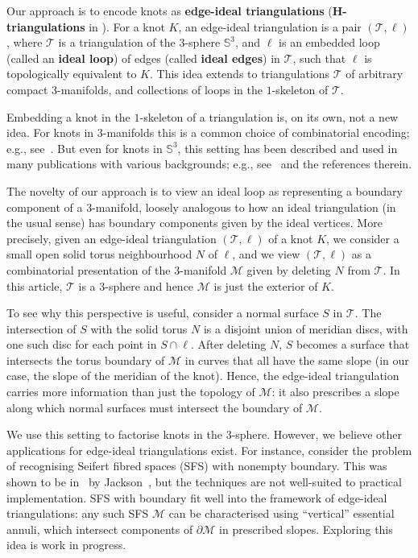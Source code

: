 \documentclass[a4paper,UKenglish,cleveref, autoref, thm-restate]{lipics-v2021}
\newcommand{\tri}{\mathcal{T}}
\newcommand{\manifold}{\mathcal{M}}
\begin{document}
Our approach is to encode knots as \textbf{edge-ideal triangulations} (\textbf{H-triangulations} in \cite{aribi2023Htriangulation}).
For a knot $K$, an edge-ideal triangulation is a pair $(\tri,\ell)$, where $\tri$ is a triangulation of the $3$-sphere $\mathbb{S}^3$,
and $\ell$ is an embedded loop (called an \textbf{ideal loop}) of edges (called \textbf{ideal edges}) in $\tri$, such that $\ell$ is topologically equivalent to $K$.
This idea extends to triangulations $\tri$ of arbitrary compact $3$-manifolds, and collections of loops in the $1$-skeleton of $\tri$.

Embedding a knot in the $1$-skeleton of a triangulation is, on its own, not a new idea. For knots in $3$-manifolds this is a common choice of combinatorial encoding; e.g., see~\cite{agol2006computational,lackenby2016efficient}.
But even for knots in $\mathbb{S}^3$, this setting has been described and used in many publications with various backgrounds;
e.g., see~\cite{aribi2023Htriangulation,Benedetti12,BenedettiLutz:KnotsInCollapsible,burton2023counterexamples,ibarra2024Htriangulation,Lickorish1991} and the references therein.

The novelty of our approach is to view an ideal loop as representing a boundary component of a $3$-manifold,
loosely analogous to how an ideal triangulation (in the usual sense) has boundary components given by the ideal vertices.
More precisely, given an edge-ideal triangulation $(\tri,\ell)$ of a knot $K$, we consider a small open solid torus neighbourhood $N$ of $\ell$,
and we view $(\tri,\ell)$ as a combinatorial presentation of the $3$-manifold $\manifold$ given by deleting $N$ from $\tri$.
In this article, $\tri$ is a $3$-sphere and hence $\manifold$ is just the exterior of $K$.

To see why this perspective is useful, consider a normal surface $S$ in $\tri$.
The intersection of $S$ with the solid torus $N$ is a disjoint union of meridian discs, with one such disc for each point in $S\cap\ell$.
After deleting $N$, $S$ becomes a surface that intersects the torus boundary of $\manifold$ in curves that all have the same slope
(in our case, the slope of the meridian of the knot).
Hence, the edge-ideal triangulation carries more information than just the topology of $\manifold$: it also prescribes a slope along which normal surfaces must intersect the boundary of $\manifold$.

We use this setting to factorise knots in the $3$-sphere. However, we believe other applications for edge-ideal triangulations exist.
For instance, consider the problem of recognising Seifert fibred spaces (SFS) with nonempty boundary.
This was shown to be in \NP\ by Jackson~\cite{jackson2024seifert}, but the techniques are not well-suited to practical implementation.
SFS with boundary fit well into the framework of edge-ideal triangulations:
any such SFS $\manifold$ can be characterised using ``vertical'' essential annuli, which intersect components of $\partial \manifold$ in prescribed slopes.
Exploring this idea is work in progress.
\end{document}
